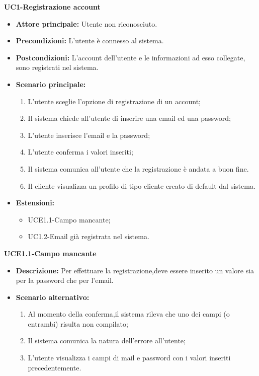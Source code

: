 \textbf{UC1-Registrazione account}
\begin{itemize}
    \item \textbf{Attore principale: }Utente non riconosciuto.
    \item \textbf{Precondizioni: }L'utente è connesso al sistema.
    \item \textbf{Postcondizioni: }L'account dell'utente e le informazioni ad esso collegate, sono registrati nel sistema.
    \item \textbf{Scenario principale:} 
        \begin{enumerate}
            \item L'utente sceglie l'opzione di registrazione di un account;
            \item Il sistema chiede all'utente di inserire una email ed una password;
            \item L'utente inserisce l'email e la password;
            \item L'utente conferma i valori inseriti;
            \item Il sistema comunica all'utente che la registrazione è andata 
            a buon fine.
            \item Il cliente visualizza un profilo di tipo cliente creato di default dal sistema.
        \end{enumerate}
    \item \textbf{Estensioni:}
        \begin{itemize}
                \item UCE1.1-Campo mancante;
                \item UC1.2-Email già registrata nel sistema.
        \end{itemize}
\end{itemize}
    
\textbf{UCE1.1-Campo mancante}
\begin{itemize}
    \item \textbf{Descrizione: }Per effettuare la registrazione,deve essere inserito un valore sia per la password che per l'email.
    \item \textbf{Scenario alternativo:}
    \begin{enumerate}
        \item Al momento della conferma,il sistema rileva che uno dei campi (o entrambi) risulta non compilato;
        \item Il sistema comunica la natura dell'errore all'utente;
        \item L'utente visualizza i campi di mail e password con i valori inseriti precedentemente.
    \end{enumerate}
\end{itemize}

